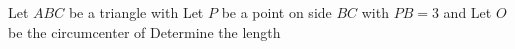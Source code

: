 Let $ ABC$ be a triangle with  Let $ P$ be a point on side $ BC$ with $ PB = 3$ and  Let $ O$ be the circumcenter of  Determine the length 